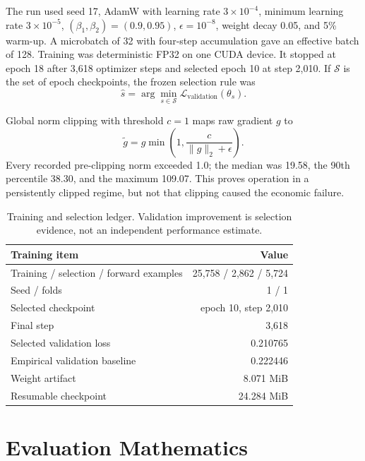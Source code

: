 \documentclass[10pt,letterpaper]{article}
\numberwithin{equation}{section}
\theoremstyle{definition}
\theoremstyle{remark}
\begin{document}
The run used seed 17, AdamW with learning rate \(3\times10^{-4}\), minimum
learning rate \(3\times10^{-5}\), \((\beta_1,\beta_2)=(0.9,0.95)\),
\(\epsilon=10^{-8}\), weight decay 0.05, and 5\% warm-up. A microbatch of 32
with four-step accumulation gave an effective batch of 128. Training was
deterministic FP32 on one CUDA device. It stopped at epoch 18 after 3,618
optimizer steps and selected epoch 10 at step 2,010. If \(\mathcal{S}\) is the
set of epoch checkpoints, the frozen selection rule was
\begin{equation}
\widehat s=\arg\min_{s\in\mathcal{S}}
\mathcal{L}_{\mathrm{validation}}(\theta_s).
\label{eq:checkpoint-rule}
\end{equation}

Global norm clipping with threshold \(c=1\) maps raw gradient \(g\) to
\begin{equation}
\widetilde g=g\min\!\left(1,\frac{c}{\lVert g\rVert_2+\epsilon}\right).
\label{eq:gradient-clipping}
\end{equation}
Every recorded pre-clipping norm exceeded 1.0; the median was 19.58, the 90th
percentile 38.30, and the maximum 109.07. This proves operation in a persistently
clipped regime, but not that clipping caused the economic failure.

\begin{table}[!htbp]
\centering
\begin{tabular}{@{}lr@{}}
\toprule
\textbf{Training item} & \textbf{Value}\\
\midrule
Training / selection / forward examples & 25,758 / 2,862 / 5,724\\
Seed / folds & 1 / 1\\
Selected checkpoint & epoch 10, step 2,010\\
Final step & 3,618\\
Selected validation loss & 0.210765\\
Empirical validation baseline & 0.222446\\
Weight artifact & 8.071 MiB\\
Resumable checkpoint & 24.284 MiB\\
\bottomrule
\end{tabular}
\caption{Training and selection ledger. Validation improvement is selection
evidence, not an independent performance estimate.}
\label{tab:training}
\end{table}

\section{Evaluation Mathematics}
\end{document}
